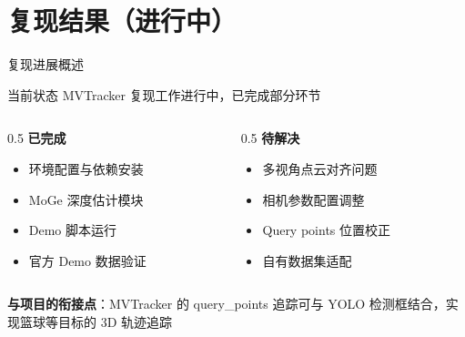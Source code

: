 \documentclass{ctexbeamer}
\begin{document}
\section{复现结果（进行中）}

\begin{frame}{复现进展概述}
  \begin{block}{当前状态}
    MVTracker 复现工作进行中，已完成部分环节
  \end{block}
  
  \vspace{0.3cm}
  \begin{columns}[T]
    \begin{column}{0.5\textwidth}
      \textbf{已完成}
      \begin{itemize}
        \item 环境配置与依赖安装
        \item MoGe 深度估计模块
        \item Demo 脚本运行
        \item 官方 Demo 数据验证
      \end{itemize}
    \end{column}
    \begin{column}{0.5\textwidth}
      \textbf{待解决}
      \begin{itemize}
        \item 多视角点云对齐问题
        \item 相机参数配置调整
        \item Query points 位置校正
        \item 自有数据集适配
      \end{itemize}
    \end{column}
  \end{columns}
  
  \vspace{0.3cm}
  \textbf{与项目的衔接点}：MVTracker 的 query\_points 追踪可与 YOLO 检测框结合，实现篮球等目标的 3D 轨迹追踪
\end{frame}
\end{document}
